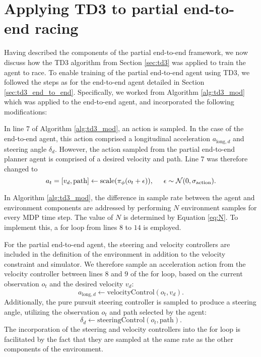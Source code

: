 
\section{Applying TD3 to partial end-to-end racing}

Having described the components of the partial end-to-end framework, we now discuss how the TD3 algorithm from Section \ref{sec:td3} was applied to train the agent to race.
To enable training of the partial end-to-end agent using TD3, we followed the steps as for the end-to-end agent detailed in Section \ref{sec:td3_end_to_end}. 
Specifically, we worked from Algorithm \ref{alg:td3_mod} which was applied to the end-to-end agent, and incorporated the following modifications:


In line $7$ of Algorithm \ref{alg:td3_mod}, an action is sampled.
In the case of the end-to-end agent, this action comprised a longitudinal acceleration $a_{\text{long},d}$ and steering angle $\delta_d$.
However, the action sampled from the partial end-to-end planner agent is comprised of a desired velocity and path.
Line $7$ was therefore changed to
\begin{equation}\label{eq:pete_agent_sample}
    a_{t} = [v_d, \text{path}] \leftarrow \text{scale}( \pi_{\phi}(o_t+\epsilon) ), \hspace{0.5cm} \epsilon \sim \mathcal{N}(0, \sigma_{\text{action}}).
\end{equation}

In Algorithm \ref{alg:td3_mod}, the difference in sample rate between the agent and environment components are addressed by performing $N$ environment samples for every MDP time step. 
The value of $N$ is determined by Equation \ref{eq:N}. 
To implement this, a for loop from lines $8$ to $14$ is employed.

For the partial end-to-end agent, the steering and velocity controllers are included in the definition of the environment in addition to the velocity constraint and simulator.
We therefore sample an acceleration action from the velocity controller between lines $8$ and $9$ of the for loop, based on  the current observation $o_t$ and the desired velocity $v_d$:
\begin{equation}\label{eq:pete_vel_sample}
    a_{\text{long},d} \leftarrow \text{velocityControl}(o_t, v_d).
\end{equation}
Additionally, the pure pursuit steering controller is sampled to produce a steering angle, utilizing the observation $o_t$ and path selected by the agent:
\begin{equation}\label{eq:pete_steer_sample}
    \delta_d \leftarrow \text{steeringControl}(o_t, \text{path}).
\end{equation}
The incorporation of the steering and velocity controllers into the for loop is facilitated by the fact that they are sampled at the same rate as the other components of the environment.

